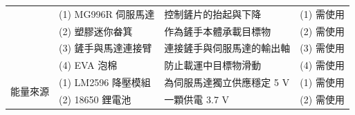 \documentclass[12pt]{article}
\begin{document}
\begin{table}[H]
\begin{tabularx}{\linewidth}{l X X X}
        & (1) MG996R 伺服馬達 & 控制鏟片的抬起與下降 & (1) 需使用 \\
        & (2) 塑膠迷你畚箕 & 作為鏟手本體承載目標物 & (2) 需使用 \\
        & (3) 鏟手與馬達連接臂 & 連接鏟手與伺服馬達的輸出軸 & (3) 需使用 \\
        & (4) EVA 泡棉 & 防止載運中目標物滑動 & (4) 需使用 \\
      \midrule
      \multirow{2}{*}{能量來源} 
        & (1) LM2596 降壓模組 & 為伺服馬達獨立供應穩定 5 V & (1) 需使用 \\
        & (2) 18650 鋰電池 & 一顆供電 3.7 V & (2) 需使用 \\
    \bottomrule
    \end{tabularx}
  \end{table}
\end{document}
